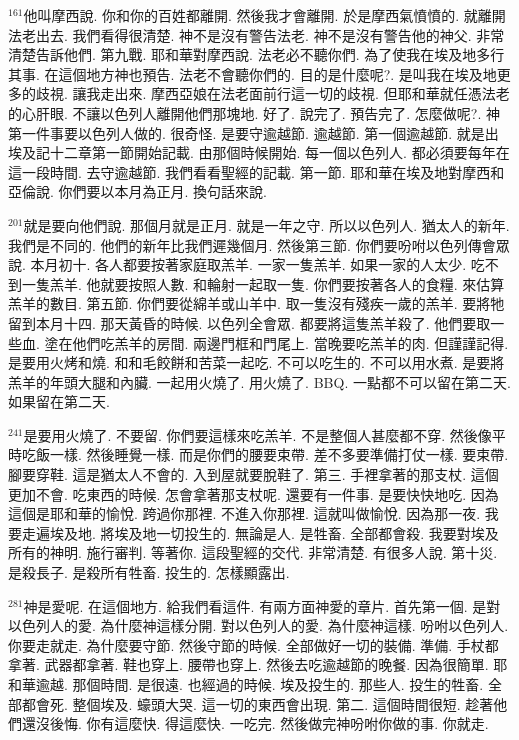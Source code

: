 \documentclass{book}
\begin{document}
$^{161}$他叫摩西說.
你和你的百姓都離開.
然後我才會離開.
於是摩西氣憤憤的.
就離開法老出去.
我們看得很清楚.
神不是沒有警告法老.
神不是沒有警告他的神父.
非常清楚告訴他們.
第九戰.
耶和華對摩西說.
法老必不聽你們.
為了使我在埃及地多行其事.
在這個地方神也預告.
法老不會聽你們的.
目的是什麼呢?.
是叫我在埃及地更多的歧視.
讓我走出來.
摩西亞娘在法老面前行這一切的歧視.
但耶和華就任憑法老的心肝眼.
不讓以色列人離開他們那塊地.
好了.
說完了.
預告完了.
怎麼做呢?.
神第一件事要以色列人做的.
很奇怪.
是要守逾越節.
逾越節.
第一個逾越節.
就是出埃及記十二章第一節開始記載.
由那個時候開始.
每一個以色列人.
都必須要每年在這一段時間.
去守逾越節.
我們看看聖經的記載.
第一節.
耶和華在埃及地對摩西和亞倫說.
你們要以本月為正月.
換句話來說.

$^{201}$就是要向他們說.
那個月就是正月.
就是一年之守.
所以以色列人.
猶太人的新年.
我們是不同的.
他們的新年比我們遲幾個月.
然後第三節.
你們要吩咐以色列傳會眾說.
本月初十.
各人都要按著家庭取羔羊.
一家一隻羔羊.
如果一家的人太少.
吃不到一隻羔羊.
他就要按照人數.
和輪射一起取一隻.
你們要按著各人的食糧.
來估算羔羊的數目.
第五節.
你們要從綿羊或山羊中.
取一隻沒有殘疾一歲的羔羊.
要將牠留到本月十四.
那天黃昏的時候.
以色列全會眾.
都要將這隻羔羊殺了.
他們要取一些血.
塗在他們吃羔羊的房間.
兩邊門框和門尾上.
當晚要吃羔羊的肉.
但謹謹記得.
是要用火烤和燒.
和和毛餃餅和苦菜一起吃.
不可以吃生的.
不可以用水煮.
是要將羔羊的年頭大腿和內臟.
一起用火燒了.
用火燒了.
BBQ.
一點都不可以留在第二天.
如果留在第二天.

$^{241}$是要用火燒了.
不要留.
你們要這樣來吃羔羊.
不是整個人甚麼都不穿.
然後像平時吃飯一樣.
然後睡覺一樣.
而是你們的腰要束帶.
差不多要準備打仗一樣.
要束帶.
腳要穿鞋.
這是猶太人不會的.
入到屋就要脫鞋了.
第三.
手裡拿著的那支杖.
這個更加不會.
吃東西的時候.
怎會拿著那支杖呢.
還要有一件事.
是要快快地吃.
因為這個是耶和華的愉悅.
跨過你那裡.
不進入你那裡.
這就叫做愉悅.
因為那一夜.
我要走遍埃及地.
將埃及地一切投生的.
無論是人.
是牲畜.
全部都會殺.
我要對埃及所有的神明.
施行審判.
等著你.
這段聖經的交代.
非常清楚.
有很多人說.
第十災.
是殺長子.
是殺所有牲畜.
投生的.
怎樣顯露出.

$^{281}$神是愛呢.
在這個地方.
給我們看這件.
有兩方面神愛的章片.
首先第一個.
是對以色列人的愛.
為什麼神這樣分開.
對以色列人的愛.
為什麼神這樣.
吩咐以色列人.
你要走就走.
為什麼要守節.
然後守節的時候.
全部做好一切的裝備.
準備.
手杖都拿著.
武器都拿著.
鞋也穿上.
腰帶也穿上.
然後去吃逾越節的晚餐.
因為很簡單.
耶和華逾越.
那個時間.
是很遠.
也經過的時候.
埃及投生的.
那些人.
投生的牲畜.
全部都會死.
整個埃及.
蠔頭大哭.
這一切的東西會出現.
第二.
這個時間很短.
趁著他們還沒後悔.
你有這麼快.
得這麼快.
一吃完.
然後做完神吩咐你做的事.
你就走.
\end{document}
